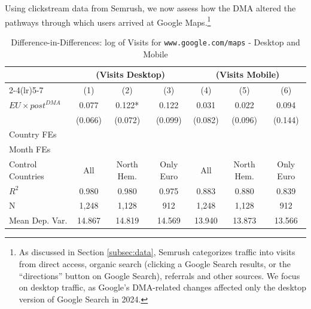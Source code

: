 \documentclass[11pt]{article}
\begin{document}
	Using clickstream data from Semrush, we now assess how the DMA altered the pathways through which users arrived at Google Maps.\footnote{As discussed in Section \ref{subsec:data}, Semrush categorizes traffic into visits from  direct access,  organic search (clicking a Google Search results, or the ``directions'' button on Google Search), referrals and other sources. We focus on desktop traffic, as Google's DMA-related changes affected only the desktop version of Google Search in 2024.} 
	
	
	\clearpage 
	
	
	\begin{table}
		\centering
		\def\sym#1{\ifmmode^{#1}\else\(^{#1}\)\fi}
		\caption{\label{tab:did_desktop_mobile} Difference-in-Differences: log of Visits for \texttt{www.google.com/maps} - Desktop and Mobile}
		\begin{threeparttable}
			\begin{tabular}{lcccccc}
				\hline \noalign{\smallskip} 
				& \multicolumn{3}{c}{(Visits Desktop)} & \multicolumn{3}{c}{(Visits Mobile)}  \\ \cmidrule(lr){2-4}\cmidrule(lr){5-7}
				 
				&         (1)   &         (2)   &         (3)   &         (4)   &         (5)   &         (6)   \\
				\midrule
				$ EU \times post^{DMA} $ &       0.077   &       0.122*  &       0.122   &       0.031   &       0.022   &       0.094   \\
				&     (0.066)   &     (0.072)   &     (0.099)   &     (0.082)   &     (0.096)   &     (0.144)   \\
				
				Country FEs         &  \checkmark   &  \checkmark   &  \checkmark   &  \checkmark   &  \checkmark   &  \checkmark   \\
				Month FEs           &  \checkmark   &  \checkmark   &  \checkmark   &  \checkmark   &  \checkmark   &  \checkmark   \\
				Control Countries    &         All   &  North Hem.   &   Only Euro   &         All   &  North Hem.   &   Only Euro   \\
				$ R ^2 $            &       0.980   &       0.980   &       0.975   &       0.883   &       0.880   &       0.839   \\
				N                   &       1,248   &       1,128   &         912   &       1,248   &       1,128   &         912   \\
				Mean Dep. Var.      &      14.867   &      14.819   &      14.569   &      13.940   &      13.873   &      13.566   \\
				\midrule
			\end{tabular}
			

\end{threeparttable}
\end{table}
\end{document}
